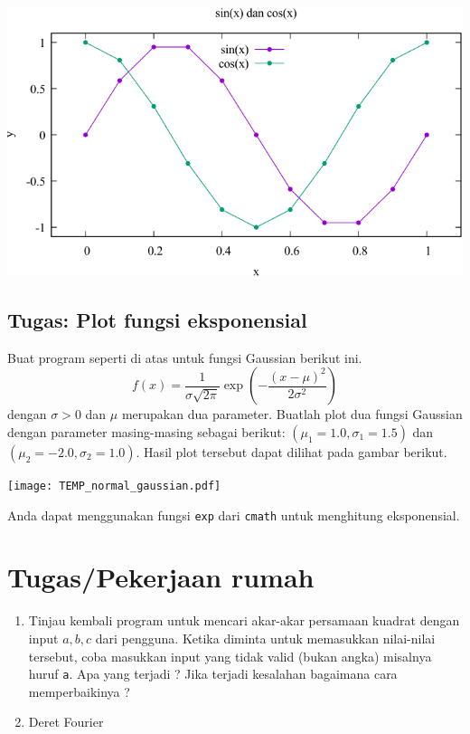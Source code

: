 \documentclass[a4paper,11pt]{extarticle}
\begin{document}
{\centering
\includegraphics[scale=1.0]{sin_cos.pdf}
\par
}


\subsection*{Tugas: Plot fungsi eksponensial}

Buat program seperti di atas untuk fungsi Gaussian berikut ini.
\begin{equation}
f(x) = \frac{1}{\sigma\sqrt{2\pi}}\exp\left(-\frac{(x-\mu)^2}{2\sigma^2}\right)
\end{equation}
dengan $\sigma > 0$ dan $\mu$ merupakan dua parameter.
Buatlah plot dua fungsi Gaussian
dengan parameter masing-masing sebagai berikut:
$(\mu_{1}=1.0,\sigma_{1}=1.5)$ dan $(\mu_{2}=-2.0,\sigma_{2}=1.0)$.
Hasil plot tersebut dapat dilihat pada gambar berikut.

{\centering
\texttt{[image: TEMP\_normal\_gaussian.pdf]}
\par}

Anda dapat menggunakan fungsi \texttt{exp} dari \texttt{cmath}
untuk menghitung eksponensial.

\section{Tugas/Pekerjaan rumah}

\begin{enumerate}
\item Tinjau kembali program untuk mencari akar-akar persamaan kuadrat dengan input
$a, b, c$ dari pengguna. Ketika diminta untuk memasukkan nilai-nilai tersebut,
coba masukkan input yang tidak valid (bukan angka) misalnya huruf \texttt{a}.
Apa yang terjadi ?
Jika terjadi kesalahan bagaimana cara memperbaikinya ?
%
\item Deret Fourier
%
\end{enumerate}
\end{document}
